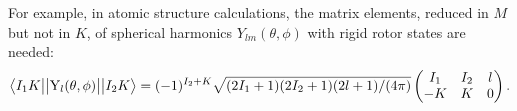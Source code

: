 For example, in atomic structure calculations, the matrix elements, reduced in $M$ but not in $K$, of spherical harmonics $Y_{lm}(\theta,\phi)$ with rigid rotor states are needed:
\begin{align}
\left< I_1K\big{|}\big{|}\text{Y}_l(\theta,\phi)\big{|}\big{|}I_2K\right>=(-1)^{I_2+K}
\sqrt{(2I_1+1)(2I_2+1)(2l+1)/(4\pi)}
\left(
\begin{matrix}
I_1&I_2&l\\
-K&K&0
\end{matrix}
\right).
\end{align}







